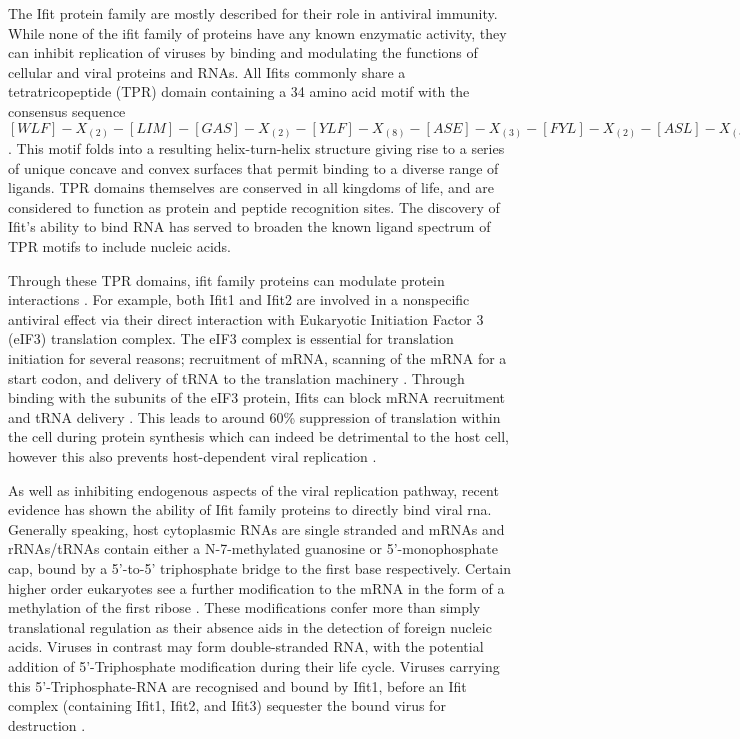 The Ifit protein family are mostly described for their role in antiviral immunity. While none of the ifit family of proteins have any known enzymatic activity, they can inhibit replication of viruses by binding and modulating the functions of cellular and viral proteins and RNAs. All Ifits commonly share a tetratricopeptide (TPR) domain containing a 34 amino acid motif with the consensus sequence $[WLF]-X_{(2)}-[LIM]-[GAS]-X_{(2)}-[YLF]-X_{(8)}-[ASE]-X_{(3)}-[FYL]-X_{(2)}-[ASL]-X_{(4)}-[PKE]$. This motif folds into a resulting helix-turn-helix structure giving rise to a series of unique concave and convex surfaces that permit binding to a diverse range of ligands. TPR domains themselves are conserved in all kingdoms of life, and are considered to function as protein and peptide recognition sites. The discovery of Ifit's ability to bind RNA has served to broaden the known ligand spectrum of TPR motifs to include nucleic acids.  

Through these TPR domains, ifit family proteins can modulate protein interactions \cite{DAndrea2003}. For example, both Ifit1 and Ifit2 are involved in a nonspecific antiviral effect via their direct interaction with Eukaryotic Initiation Factor 3 (eIF3) translation complex. The eIF3 complex is essential for translation initiation for several reasons; recruitment of mRNA, scanning of the mRNA for a start codon, and delivery of tRNA to the translation machinery \cite{Merrick2004}. Through binding with the subunits of the eIF3 protein, Ifits can block mRNA recruitment and tRNA delivery \cite{Hui2003}. This leads to around 60\% suppression of translation within the cell during protein synthesis which can indeed be detrimental to the host cell, however this also prevents host-dependent viral replication \cite{Hui2005,Terenzi2006,Guo2000}. 

As well as inhibiting endogenous aspects of the viral replication pathway, recent evidence has shown the ability of Ifit family proteins to directly bind viral \acrshort{rna}. Generally speaking, host cytoplasmic RNAs are single stranded and mRNAs and rRNAs/tRNAs contain either a N-7-methylated guanosine or 5'-monophosphate cap, bound by a 5'-to-5' triphosphate bridge to the first base respectively. Certain higher order eukaryotes see a further modification to the mRNA in the form of a methylation of the first ribose \cite{Topisirovic2011,Gebauer2004}. These modifications confer more than simply translational regulation as their absence aids in the detection of foreign nucleic acids. Viruses in contrast may form double-stranded RNA, with the potential addition of 5'-Triphosphate modification during their life cycle. Viruses carrying this 5'-Triphosphate-RNA are recognised and bound by Ifit1, before an Ifit complex (containing Ifit1, Ifit2, and Ifit3) sequester the bound virus for destruction \cite{Pichlmair2011}. 

